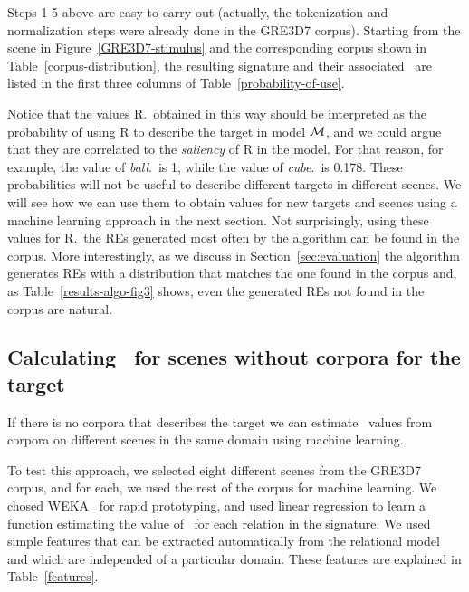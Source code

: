 Steps 1-5 above are easy to carry out (actually, the tokenization and normalization steps were already done in the GRE3D7 corpus). Starting from the scene in Figure~\ref{GRE3D7-stimulus} and the corresponding corpus shown in Table~\ref{corpus-distribution}, the resulting signature and their associated \puse\ are listed in the first three columns of Table~\ref{probability-of-use}. 

Notice that the values R.\puse\ obtained in this way should be interpreted as the probability of using R to describe the target in model $\mathcal{M}$, and we could argue that they are correlated to the \emph{saliency} of R in the model.  
For that reason, for example, the value of \emph{ball}.\puse\ is 1, while the value of \emph{cube}.\puse\ is 0.178.  These probabilities will not be useful to describe different targets in different scenes.  We will see how we can use them to obtain values for new targets and scenes using a machine learning approach in the next section.  Not surprisingly, using these values for R.\puse\ the REs generated most often by the algorithm can be found in the corpus.  More interestingly, as we discuss in Section~\ref{sec:evaluation} the algorithm generates REs with a distribution that matches the one found in the corpus and, as Table~\ref{results-algo-fig3} shows, even the generated REs not found in the corpus are natural.    


\subsection{Calculating \puse\ for scenes without corpora for the target} \label{subsec:learning}

If there is no corpora that describes the target we can estimate  \puse\ values from corpora on different scenes in the same domain using machine learning. 

To test this approach, we selected eight different scenes from the GRE3D7 corpus, and for each, we used the rest of the corpus for machine learning. We chosed WEKA~\cite{Hall:WEK09} for rapid prototyping, and used linear regression to learn a function estimating the value of \puse\ for each relation in the signature.  We used simple features that can be extracted automatically from the relational model and which are independed of a particular domain. These features are explained in Table~\ref{features}.  

